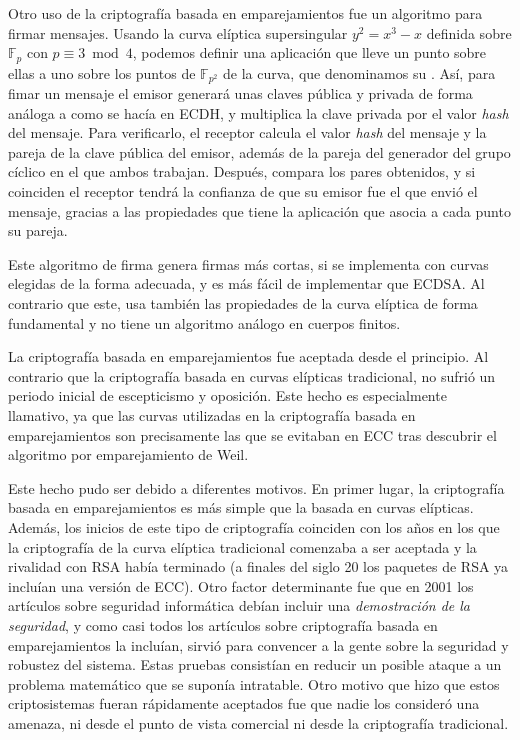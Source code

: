 \documentclass[
  a4paper,
  12pt,
  spanish,
]{scrartcl}
\begin{document}
Otro uso de la criptografía basada en emparejamientos fue un algoritmo para firmar mensajes. Usando la curva elíptica supersingular $y^2 = x^3- x$ definida sobre $\mathbb{F}_p$ con $p \equiv 3 \bmod 4$, podemos definir una aplicación que lleve un punto sobre ellas a uno sobre los puntos de $\mathbb{F}_{p^2}$ de la curva, que denominamos su . Así, para fimar un mensaje el emisor generará unas claves pública y privada de forma análoga a como se hacía en ECDH, y multiplica la clave privada por el valor \textit{hash} del mensaje. Para verificarlo, el receptor calcula el valor \textit{hash} del mensaje y la pareja de la clave pública del emisor, además de la pareja del generador del grupo cíclico en el que ambos trabajan. Después, compara los pares obtenidos, y si coinciden el receptor tendrá la confianza de que su emisor fue el que envió el mensaje, gracias a las propiedades que tiene la aplicación que asocia a cada punto su pareja.

Este algoritmo de firma genera firmas más cortas, si se implementa con curvas elegidas de la forma adecuada, y es más fácil de implementar que ECDSA. Al contrario que este, usa también las propiedades de la curva elíptica de forma fundamental y no tiene un algoritmo análogo en cuerpos finitos.

La criptografía basada en emparejamientos fue aceptada desde el principio. Al contrario que la criptografía basada en curvas elípticas tradicional, no sufrió un periodo inicial de escepticismo y oposición. Este hecho es especialmente llamativo, ya que las curvas utilizadas en la criptografía basada en emparejamientos son precisamente las que se evitaban en ECC tras descubrir el algoritmo por emparejamiento de Weil.

Este hecho pudo ser debido a diferentes motivos. En primer lugar, la criptografía basada en emparejamientos es más simple que la basada en curvas elípticas. Además, los inicios de este tipo de criptografía coinciden con los años en los que la criptografía de la curva elíptica tradicional comenzaba a ser aceptada y la rivalidad con RSA había terminado (a finales del siglo 20 los paquetes de RSA ya incluían una versión de ECC). Otro factor determinante fue que en 2001 los artículos sobre seguridad informática debían incluir una \textit{demostración de la seguridad}, y como casi todos los artículos sobre criptografía basada en emparejamientos la incluían, sirvió para convencer a la gente sobre la seguridad y robustez del sistema. Estas pruebas consistían en reducir un posible ataque a un problema matemático que se suponía intratable. Otro motivo que hizo que estos criptosistemas fueran rápidamente aceptados fue que nadie los consideró una amenaza, ni desde el punto de vista comercial ni desde la criptografía tradicional. 
\end{document}
